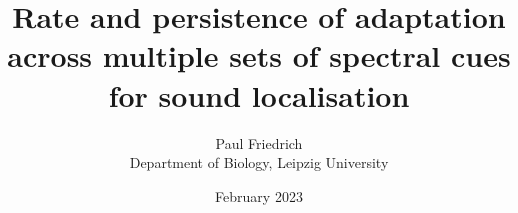 \documentclass[12pt]{article}
\newcommand\thesistitle{Rate and persistence of adaptation across multiple sets of spectral cues for sound localisation} %
\begin{document}
\title{\thesistitle}%
\author{Paul Friedrich\\Department of Biology, Leipzig University}
\date{February 2023}
\maketitle









\nocite{*}

\end{document}
